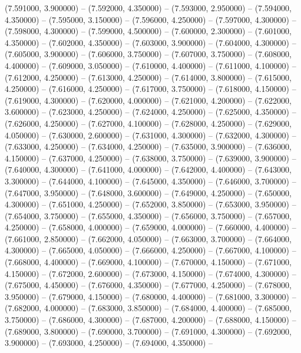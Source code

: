 (7.591000, 3.900000) -- 
(7.592000, 4.350000) -- 
(7.593000, 2.950000) -- 
(7.594000, 4.350000) -- 
(7.595000, 3.150000) -- 
(7.596000, 4.250000) -- 
(7.597000, 4.300000) -- 
(7.598000, 4.300000) -- 
(7.599000, 4.500000) -- 
(7.600000, 2.300000) -- 
(7.601000, 4.350000) -- 
(7.602000, 4.350000) -- 
(7.603000, 3.900000) -- 
(7.604000, 4.300000) -- 
(7.605000, 3.900000) -- 
(7.606000, 3.750000) -- 
(7.607000, 3.750000) -- 
(7.608000, 4.400000) -- 
(7.609000, 3.050000) -- 
(7.610000, 4.400000) -- 
(7.611000, 4.100000) -- 
(7.612000, 4.250000) -- 
(7.613000, 4.250000) -- 
(7.614000, 3.800000) -- 
(7.615000, 4.250000) -- 
(7.616000, 4.250000) -- 
(7.617000, 3.750000) -- 
(7.618000, 4.150000) -- 
(7.619000, 4.300000) -- 
(7.620000, 4.000000) -- 
(7.621000, 4.200000) -- 
(7.622000, 3.600000) -- 
(7.623000, 4.250000) -- 
(7.624000, 4.250000) -- 
(7.625000, 4.350000) -- 
(7.626000, 4.250000) -- 
(7.627000, 4.100000) -- 
(7.628000, 4.250000) -- 
(7.629000, 4.050000) -- 
(7.630000, 2.600000) -- 
(7.631000, 4.300000) -- 
(7.632000, 4.300000) -- 
(7.633000, 4.250000) -- 
(7.634000, 4.250000) -- 
(7.635000, 3.900000) -- 
(7.636000, 4.150000) -- 
(7.637000, 4.250000) -- 
(7.638000, 3.750000) -- 
(7.639000, 3.900000) -- 
(7.640000, 4.300000) -- 
(7.641000, 4.000000) -- 
(7.642000, 4.400000) -- 
(7.643000, 3.300000) -- 
(7.644000, 4.100000) -- 
(7.645000, 4.350000) -- 
(7.646000, 3.700000) -- 
(7.647000, 3.950000) -- 
(7.648000, 3.600000) -- 
(7.649000, 4.250000) -- 
(7.650000, 4.300000) -- 
(7.651000, 4.250000) -- 
(7.652000, 3.850000) -- 
(7.653000, 3.950000) -- 
(7.654000, 3.750000) -- 
(7.655000, 4.350000) -- 
(7.656000, 3.750000) -- 
(7.657000, 4.250000) -- 
(7.658000, 4.000000) -- 
(7.659000, 4.000000) -- 
(7.660000, 4.400000) -- 
(7.661000, 2.850000) -- 
(7.662000, 4.050000) -- 
(7.663000, 3.700000) -- 
(7.664000, 4.300000) -- 
(7.665000, 4.050000) -- 
(7.666000, 4.250000) -- 
(7.667000, 4.100000) -- 
(7.668000, 4.400000) -- 
(7.669000, 4.100000) -- 
(7.670000, 4.150000) -- 
(7.671000, 4.150000) -- 
(7.672000, 2.600000) -- 
(7.673000, 4.150000) -- 
(7.674000, 4.300000) -- 
(7.675000, 4.450000) -- 
(7.676000, 4.350000) -- 
(7.677000, 4.250000) -- 
(7.678000, 3.950000) -- 
(7.679000, 4.150000) -- 
(7.680000, 4.400000) -- 
(7.681000, 3.300000) -- 
(7.682000, 4.000000) -- 
(7.683000, 3.850000) -- 
(7.684000, 4.400000) -- 
(7.685000, 3.750000) -- 
(7.686000, 4.300000) -- 
(7.687000, 4.200000) -- 
(7.688000, 4.150000) -- 
(7.689000, 3.800000) -- 
(7.690000, 3.700000) -- 
(7.691000, 4.300000) -- 
(7.692000, 3.900000) -- 
(7.693000, 4.250000) -- 
(7.694000, 4.350000) -- 
